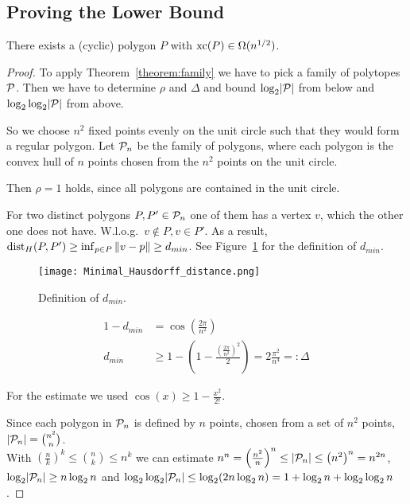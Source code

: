 \subsection{Proving the Lower Bound}

\begin{corollary}\label{corollary:lower-bound}
  There exists a (cyclic) polygon $P$ with $\xc(P) \in \Omega(n^{1/2})$.
\end{corollary}
\begin{proof}
  To apply Theorem~\ref{theorem:family} we have to pick a family of polytopes $\P$. Then we have to determine $\rho$ and $\Delta$ and bound $\log_2 \abs{\P}$ from below and $\log_2 \log_2 \abs{\P}$ from above.

  So we choose $n^2$ fixed points evenly on the unit circle such that they would form a regular polygon. Let $\P_n$ be the family of polygons, where each polygon is the convex hull of $n$ points chosen from the $n^2$ points on the unit circle.

  Then $\rho = 1$ holds, since all polygons are contained in the unit circle.

  For two distinct polygons $P, P' \in \P_n$ one of them has a vertex $v$, which the other one does not have. W.l.o.g.\ $v \notin P, v \in P'$. As a result, $\dist_H(P,P') \geq \inf_{p \in P} \norm{v-p} \geq d_{min}$. See Figure~\ref{fig:distance} for the definition of $d_{min}$.

  \begin{figure}[ht]
    \centering
    \texttt{[image: Minimal\_Hausdorff\_distance.png]}
    \caption{Definition of $d_{min}$.}
    \label{fig:distance}
  \end{figure}

  \begin{align*}
    1 - d_{min} & = \cos\left( \frac{2 \pi}{n^2} \right)                                                                \\
    d_{min}     & \geq 1 - \left(1 - \frac{\left(\frac{2 \pi}{n^2}\right)^2}{2} \right) = 2 \frac{\pi^2}{n^4} =: \Delta
  \end{align*}

  For the estimate we used $\cos(x) \geq 1 - \frac{x^2}{2!}$.

  Since each polygon in $\P_n$ is defined by $n$ points, chosen from a set of $n^2$ points, $\abs{\P_n} = \binom{n^2}{n}$.\\
  With $(\frac{n}{k})^k \leq \binom{n}{k} \leq n^k$ we can estimate $n^n = \left( \frac{n^2}{n} \right)^n \leq \abs{\P_n} \leq \left( n^2 \right)^n = n^{2n}$, \\
  $\log_2 \abs{\P_n} \geq n \log_2 n$ and
  $\log_2 \log_2 \abs{\P_n} \leq \log_2 (2n \log_2 n) = 1 + \log_2 n + \log_2 \log_2 n$.


\end{proof}
